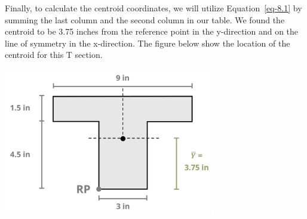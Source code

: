\documentclass[
  letterpaper,
  DIV=11,
  numbers=noendperiod]{scrreprt}
\theoremstyle{definition}
\theoremstyle{remark}
\begin{document}
\begin{tcolorbox}
\begin{tcolorbox}
Finally, to calculate the centroid coordinates, we will utilize
Equation~\ref{eq-8.1} by summing the last column and the second column
in our table. We found the centroid to be 3.75 inches from the reference
point in the y-direction and on the line of symmetry in the x-direction.
The figure below show the location of the centroid for this T section.

\begin{center}
\includegraphics[width=3.64583in,height=\textheight]{images/CH 8 PNGs/example 8.1 part 4.png}
\end{center}

\end{tcolorbox}

\end{tcolorbox}
\end{document}
